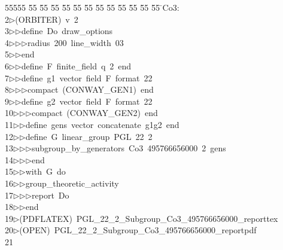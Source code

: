 %
%
\begin{tabbing}
55555 \= 55 \= 55 \= 55 \= 55 \= 55 \= 55 \= 55 \= 55 \= 55 \= 55 \= 55 \= 55 \= \>Co3:\\[0pt]
2\>$\triangleright$\>(ORBITER)\ v\ 2\ \\[0pt]
3\>$\triangleright$\>$\triangleright$\>define\ Do\ draw\_options\ \\[0pt]
4\>$\triangleright$\>$\triangleright$\>$\triangleright$\>radius\ 200\ line\_width\ 03\ \\[0pt]
5\>$\triangleright$\>$\triangleright$\>end\ \\[0pt]
6\>$\triangleright$\>$\triangleright$\>define\ F\ finite\_field\ q\ 2\ end\ \\[0pt]
7\>$\triangleright$\>$\triangleright$\>define\ g1\ vector\ field\ F\ format\ 22\ \\[0pt]
8\>$\triangleright$\>$\triangleright$\>$\triangleright$\>compact\ (CONWAY\_GEN1)\ end\ \\[0pt]
9\>$\triangleright$\>$\triangleright$\>define\ g2\ vector\ field\ F\ format\ 22\ \\[0pt]
10\>$\triangleright$\>$\triangleright$\>$\triangleright$\>compact\ (CONWAY\_GEN2)\ end\ \\[0pt]
11\>$\triangleright$\>$\triangleright$\>define\ gens\ vector\ concatenate\ g1g2\ end\ \\[0pt]
12\>$\triangleright$\>$\triangleright$\>define\ G\ linear\_group\ PGL\ 22\ 2\ \\[0pt]
13\>$\triangleright$\>$\triangleright$\>$\triangleright$\>subgroup\_by\_generators\ Co3\ 495766656000\ 2\ gens\ \\[0pt]
14\>$\triangleright$\>$\triangleright$\>$\triangleright$\>end\ \\[0pt]
15\>$\triangleright$\>$\triangleright$\>with\ G\ do\ \\[0pt]
16\>$\triangleright$\>$\triangleright$\>group\_theoretic\_activity\ \\[0pt]
17\>$\triangleright$\>$\triangleright$\>$\triangleright$\>report\ Do\ \\[0pt]
18\>$\triangleright$\>$\triangleright$\>end\\[0pt]
19\>$\triangleright$\>(PDFLATEX)\ PGL\_22\_2\_Subgroup\_Co3\_495766656000\_reporttex\\[0pt]
20\>$\triangleright$\>(OPEN)\ PGL\_22\_2\_Subgroup\_Co3\_495766656000\_reportpdf\\[0pt]
21\>\end{tabbing}
